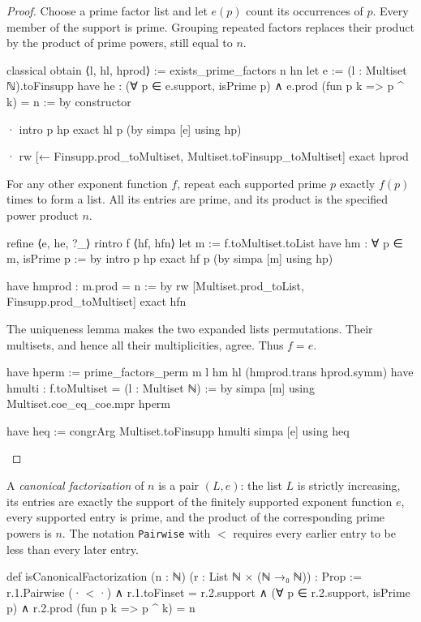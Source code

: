 \begin{proof}
  Choose a prime factor list and let $e(p)$ count its occurrences of $p$.
  Every member of the support is prime.
  Grouping repeated factors replaces their product by the product of prime powers, still equal to
  $n$.

  \begin{lean}
    classical
    obtain ⟨l, hl, hprod⟩ := exists_prime_factors n hn
    let e := (l : Multiset ℕ).toFinsupp
    have he : (∀ p ∈ e.support, isPrime p) ∧ e.prod (fun p k => p ^ k) = n := by
      constructor

      · intro p hp
        exact hl p (by simpa [e] using hp)

      · rw [← Finsupp.prod_toMultiset, Multiset.toFinsupp_toMultiset]
        exact hprod
  \end{lean}

  For any other exponent function $f$, repeat each supported prime $p$ exactly $f(p)$ times to
  form a list.
  All its entries are prime, and its product is the specified power product $n$.

  \begin{lean}
    refine ⟨e, he, ?_⟩
    rintro f ⟨hf, hfn⟩
    let m := f.toMultiset.toList
    have hm : ∀ p ∈ m, isPrime p := by
      intro p hp
      exact hf p (by simpa [m] using hp)

    have hmprod : m.prod = n := by
      rw [Multiset.prod_toList, Finsupp.prod_toMultiset]
      exact hfn
  \end{lean}

  The uniqueness lemma makes the two expanded lists permutations.
  Their multisets, and hence all their multiplicities, agree.
  Thus $f=e$.

  \begin{lean}
    have hperm := prime_factors_perm m l hm hl (hmprod.trans hprod.symm)
    have hmulti : f.toMultiset = (l : Multiset ℕ) := by
      simpa [m] using Multiset.coe_eq_coe.mpr hperm

    have heq := congrArg Multiset.toFinsupp hmulti
    simpa [e] using heq
  \end{lean}

\end{proof}

\begin{definition}
  A \emph{canonical factorization} of $n$ is a pair $(L,e)$: the list $L$ is strictly increasing,
  its entries are exactly the support of the finitely supported exponent function $e$, every
  supported entry is prime, and the product of the corresponding prime powers is $n$.
  The notation \texttt{Pairwise} with $<$ requires every earlier entry to be less than every later
  entry.

  \begin{lean}
    def isCanonicalFactorization (n : ℕ) (r : List ℕ × (ℕ →₀ ℕ)) : Prop :=
      r.1.Pairwise (· < ·) ∧ r.1.toFinset = r.2.support ∧
        (∀ p ∈ r.2.support, isPrime p) ∧ r.2.prod (fun p k => p ^ k) = n
  \end{lean}
\end{definition}


